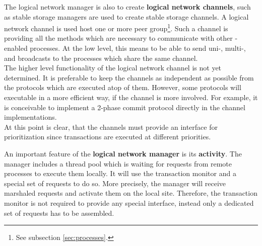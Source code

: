 \documentclass[a4paper, 10pt]{book}
\begin{document}
                                The logical network manager is also to create \textbf{logical network
                                channels}, such as stable storage managers are used to create stable
                                storage channels. A logical network channel is used host one or more
                                peer group\footnote{See subsection \vref{sec:processes}.}.
                                Such a channel is providing all the methods which are necessary to
                                communicate with other \SYNEIGHT-enabled processes. At the low level, this
                                means to be able to send uni-, multi-, and broadcasts to the processes
                                which share the same channel.\\
                                The higher level functionality of the logical network channel is not
                                yet determined. It is preferable to keep the channels as independent
                                as possible from the protocols which are executed atop of
                                them. However, some protocols will executable in a more efficient way,
                                if the channel is more involved. For example, it is conceivable to
                                implement a 2-phase commit protocol directly in the channel
                                implementations.\\
                                At this point is clear, that the channels must provide an interface
                                for prioritization since transactions are executed at different
                                priorities.  

                                An important feature of the \textbf{logical network manager} is its
                                \textbf{activity}. The manager includes a thread pool which is waiting
                                for requests from remote processes to execute them locally. It will
                                use the transaction monitor and a special set of requests to do
                                so. More precisely, the manager will receive marshaled requests and
                                activate them on the local site. Therefore, the transaction monitor is
                                not required to provide any special interface, instead only a
                                dedicated set of requests has to be assembled. 
\end{document}
